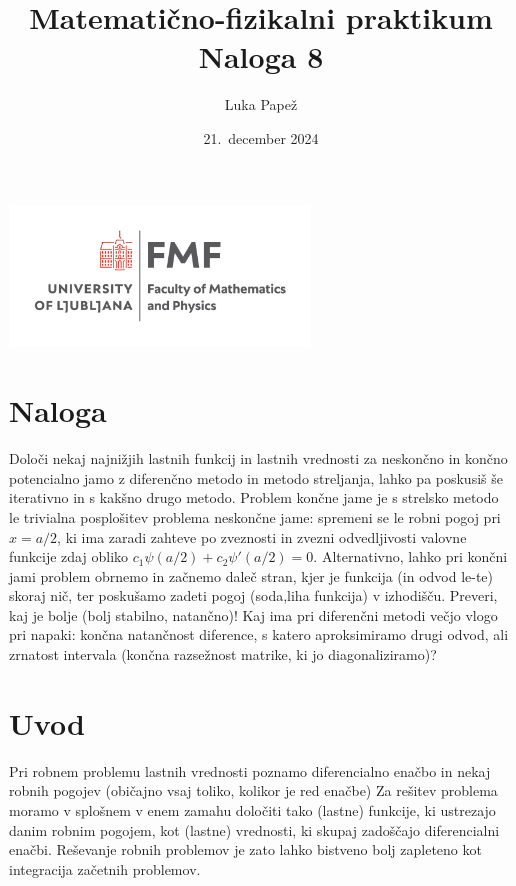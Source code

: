 \documentclass{article}
\begin{document}
\title{Matematično-fizikalni praktikum \\[3mm] \large Naloga 8}
\author{Luka Papež}
\date{21.\ december 2024}

\begin{center}
    \includegraphics[width=8cm]{logo-fmf.png}
\end{center}

{
    \let\newpage\relax
    \maketitle
}

\maketitle
\newpage
\section{Naloga}
Določi nekaj najnižjih lastnih funkcij in lastnih
vrednosti za
neskončno in končno potencialno jamo z diferenčno metodo in metodo streljanja, lahko pa poskusiš še iterativno in  s kakšno drugo metodo. 
Problem končne jame je s strelsko metodo le trivialna posplošitev
problema neskončne jame: spremeni se le robni pogoj pri $x=a/2$,
ki ima zaradi zahteve po zveznosti in zvezni odvedljivosti valovne
funkcije zdaj obliko $c_1\psi(a/2) + c_2\psi'(a/2) = 0$. 
Alternativno, lahko pri končni jami problem obrnemo in začnemo daleč stran, kjer je funkcija 
(in odvod le-te) skoraj nič, ter poskušamo zadeti  pogoj (soda,liha funkcija) v izhodišču. Preveri,
kaj je bolje (bolj stabilno, natančno)!
Kaj ima pri diferenčni metodi večjo vlogo pri napaki:
končna natančnost diference, s katero aproksimiramo drugi odvod,
ali zrnatost intervala (končna razsežnost matrike, ki jo
diagonaliziramo)?
\section{Uvod}

Pri robnem problemu lastnih vrednosti poznamo diferencialno enačbo
in nekaj robnih pogojev (običajno vsaj toliko, kolikor je red enačbe)
Za rešitev problema moramo v splošnem v enem zamahu določiti
tako (lastne) funkcije, ki ustrezajo danim robnim pogojem,
kot (lastne) vrednosti, ki skupaj zadoščajo diferencialni enačbi.
Reševanje robnih problemov je zato lahko bistveno bolj zapleteno
kot integracija začetnih problemov.
\end{document}

